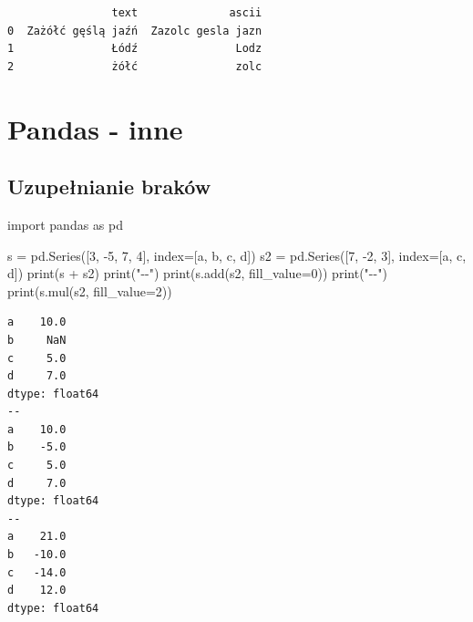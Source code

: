 \documentclass[
  polish,
  letterpaper,
  DIV=11,
  numbers=noendperiod]{scrreprt}
\newenvironment{Shaded}{\begin{snugshade}}{\end{snugshade}}
\newcommand{\BuiltInTok}[1]{\textcolor[rgb]{0.00,0.23,0.31}{#1}}
\newcommand{\DecValTok}[1]{\textcolor[rgb]{0.68,0.00,0.00}{#1}}
\newcommand{\ImportTok}[1]{\textcolor[rgb]{0.00,0.46,0.62}{#1}}
\newcommand{\NormalTok}[1]{\textcolor[rgb]{0.00,0.23,0.31}{#1}}
\newcommand{\OperatorTok}[1]{\textcolor[rgb]{0.37,0.37,0.37}{#1}}
\newcommand{\StringTok}[1]{\textcolor[rgb]{0.13,0.47,0.30}{#1}}
\begin{document}
\begin{verbatim}
                text              ascii
0  Zażółć gęślą jaźń  Zazolc gesla jazn
1               Łódź               Lodz
2               żółć               zolc
\end{verbatim}

\chapter{Pandas - inne}\label{pandas---inne}

\section{Uzupełnianie braków}\label{uzupeux142nianie-brakuxf3w}

\begin{Shaded}
\begin{Highlighting}[]
\ImportTok{import}\NormalTok{ pandas }\ImportTok{as}\NormalTok{ pd}

\NormalTok{s }\OperatorTok{=}\NormalTok{ pd.Series([}\DecValTok{3}\NormalTok{, }\OperatorTok{{-}}\DecValTok{5}\NormalTok{, }\DecValTok{7}\NormalTok{, }\DecValTok{4}\NormalTok{], index}\OperatorTok{=}\NormalTok{[}\StringTok{\textquotesingle{}a\textquotesingle{}}\NormalTok{, }\StringTok{\textquotesingle{}b\textquotesingle{}}\NormalTok{, }\StringTok{\textquotesingle{}c\textquotesingle{}}\NormalTok{, }\StringTok{\textquotesingle{}d\textquotesingle{}}\NormalTok{])}
\NormalTok{s2 }\OperatorTok{=}\NormalTok{ pd.Series([}\DecValTok{7}\NormalTok{, }\OperatorTok{{-}}\DecValTok{2}\NormalTok{, }\DecValTok{3}\NormalTok{], index}\OperatorTok{=}\NormalTok{[}\StringTok{\textquotesingle{}a\textquotesingle{}}\NormalTok{, }\StringTok{\textquotesingle{}c\textquotesingle{}}\NormalTok{, }\StringTok{\textquotesingle{}d\textquotesingle{}}\NormalTok{])}
\BuiltInTok{print}\NormalTok{(s }\OperatorTok{+}\NormalTok{ s2)}
\BuiltInTok{print}\NormalTok{(}\StringTok{"{-}{-}"}\NormalTok{)}
\BuiltInTok{print}\NormalTok{(s.add(s2, fill\_value}\OperatorTok{=}\DecValTok{0}\NormalTok{))}
\BuiltInTok{print}\NormalTok{(}\StringTok{"{-}{-}"}\NormalTok{)}
\BuiltInTok{print}\NormalTok{(s.mul(s2, fill\_value}\OperatorTok{=}\DecValTok{2}\NormalTok{))}
\end{Highlighting}
\end{Shaded}

\begin{verbatim}
a    10.0
b     NaN
c     5.0
d     7.0
dtype: float64
--
a    10.0
b    -5.0
c     5.0
d     7.0
dtype: float64
--
a    21.0
b   -10.0
c   -14.0
d    12.0
dtype: float64
\end{verbatim}
\end{document}
